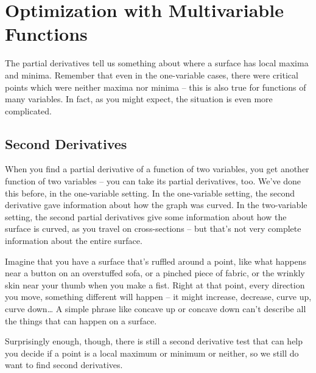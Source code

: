 \section{Optimization with Multivariable Functions}
\label{sec:multi-opt}

The partial derivatives tell us something about where a surface has local maxima and minima. Remember that even in the one-variable cases, there were critical points which were neither maxima nor minima – this is also true for functions of many variables. In fact, as you might expect, the situation is even more complicated.

\subsection{Second Derivatives}
When you find a partial derivative of a function of two variables, you get another function of two variables – you can take its partial derivatives, too. We've done this before, in the one-variable setting. In the one-variable setting, the second derivative gave information about how the graph was curved. In the two-variable setting, the second partial derivatives give some information about how the surface is curved, as you travel on cross-sections – but that's not very complete information about the entire surface.

Imagine that you have a surface that's ruffled around a point, like what happens near a button on an overstuffed sofa, or a pinched piece of fabric, or the wrinkly skin near your thumb when you make a fist. Right at that point, every direction you move, something different will happen – it might increase, decrease, curve up, curve down… A simple phrase like concave up or concave down can't describe all the things that can happen on a surface.

Surprisingly enough, though, there is still a second derivative test that can help you decide if a point is a local maximum or minimum or neither, so we still do want to find second derivatives.

